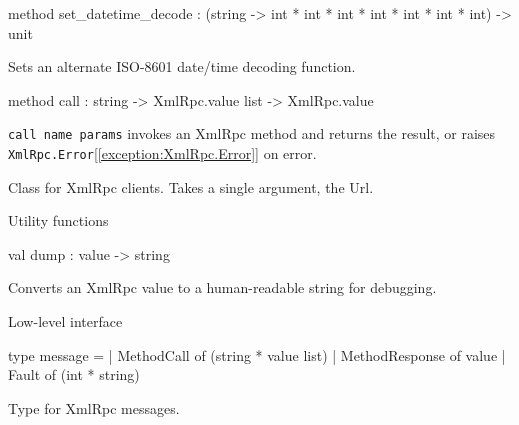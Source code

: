 \documentclass[11pt]{article}
\begin{document}
\begin{ocamldocobjectend}
\begin{ocamldocdescription}
\end{ocamldocdescription}


\label{method:XmlRpc.client.set-underscoredatetime-underscoredecode}\begin{ocamldoccode}
method set_datetime_decode :
  (string -> int * int * int * int * int * int * int) -> unit
\end{ocamldoccode}
\begin{ocamldocdescription}
Sets an alternate ISO-8601 date/time decoding function.


\end{ocamldocdescription}


\label{method:XmlRpc.client.call}\begin{ocamldoccode}
method call : string -> XmlRpc.value list -> XmlRpc.value
\end{ocamldoccode}
\begin{ocamldocdescription}
{\tt{call name params}} invokes an XmlRpc method and returns the result,
      or raises {\tt{XmlRpc.Error}}[\ref{exception:XmlRpc.Error}] on error.


\end{ocamldocdescription}
\end{ocamldocobjectend}


\begin{ocamldocdescription}
Class for XmlRpc clients. Takes a single argument, the Url.


\end{ocamldocdescription}




Utility functions



\label{val:XmlRpc.dump}\begin{ocamldoccode}
val dump : value -> string
\end{ocamldoccode}
\begin{ocamldocdescription}
Converts an XmlRpc value to a human-readable string for debugging.


\end{ocamldocdescription}




Low-level interface



\label{type:XmlRpc.message}\begin{ocamldoccode}
type message =
  | MethodCall of (string * value list)
  | MethodResponse of value
  | Fault of (int * string)
\end{ocamldoccode}
\begin{ocamldocdescription}
Type for XmlRpc messages.


\end{ocamldocdescription}
\end{document}
